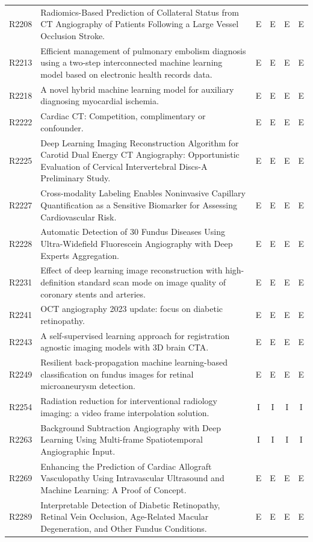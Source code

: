 \begin{longtable}{@{}l p{8.6cm} c c c c@{}}
R2208 & Radiomics-Based Prediction of Collateral Status from CT Angiography of Patients Following a Large Vessel Occlusion Stroke. & E & E & E & E \\
R2213 & Efficient management of pulmonary embolism diagnosis using a two-step interconnected machine learning model based on electronic health records data. & E & E & E & E \\
R2218 & A novel hybrid machine learning model for auxiliary diagnosing myocardial ischemia. & E & E & E & E \\
R2222 & Cardiac CT: Competition, complimentary or confounder. & E & E & E & E \\
R2225 & Deep Learning Imaging Reconstruction Algorithm for Carotid Dual Energy CT Angiography: Opportunistic Evaluation of Cervical Intervertebral Discs-A Preliminary Study. & E & E & E & E \\
R2227 & Cross-modality Labeling Enables Noninvasive Capillary Quantification as a Sensitive Biomarker for Assessing Cardiovascular Risk. & E & E & E & E \\
R2228 & Automatic Detection of 30 Fundus Diseases Using Ultra-Widefield Fluorescein Angiography with Deep Experts Aggregation. & E & E & E & E \\
R2231 & Effect of deep learning image reconstruction with high-definition standard scan mode on image quality of coronary stents and arteries. & E & E & E & E \\
R2241 & OCT angiography 2023 update: focus on diabetic retinopathy. & E & E & E & E \\
R2243 & A self-supervised learning approach for registration agnostic imaging models with 3D brain CTA. & E & E & E & E \\
R2249 & Resilient back-propagation machine learning-based classification on fundus images for retinal microaneurysm detection. & E & E & E & E \\
R2254 & Radiation reduction for interventional radiology imaging: a video frame interpolation solution. & I & I & I & I \\
R2263 & Background Subtraction Angiography with Deep Learning Using Multi-frame Spatiotemporal Angiographic Input. & I & I & I & I \\
R2269 & Enhancing the Prediction of Cardiac Allograft Vasculopathy Using Intravascular Ultrasound and Machine Learning: A Proof of Concept. & E & E & E & E \\
R2289 & Interpretable Detection of Diabetic Retinopathy, Retinal Vein Occlusion, Age-Related Macular Degeneration, and Other Fundus Conditions. & E & E & E & E \\

\end{longtable}
